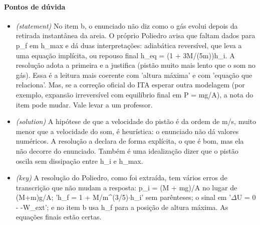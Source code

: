\documentclass{article}%
\begin{document}
\paragraph{Pontos de dúvida}%
\begin{itemize}%
\item%
\textit{(statement)} No item b, o enunciado não diz como o gás evolui depois da retirada instantânea da areia. O próprio Poliedro avisa que faltam dados para p\_f em h\_max e dá duas interpretações: adiabática reversível, que leva a uma equação implícita, ou repouso final h\_eq = (1 + 3M/(5m))h\_i. A resolução adota a primeira e a justifica (pistão muito mais lento que o som no gás). Essa é a leitura mais coerente com 'altura máxima' e com 'equação que relaciona'. Mas, se a correção oficial do ITA esperar outra modelagem (por exemplo, expansão irreversível com equilíbrio final em P = mg/A), a nota do item pode mudar. Vale levar a um professor.%
\item%
\textit{(solution)} A hipótese de que a velocidade do pistão é da ordem de m/s, muito menor que a velocidade do som, é heurística: o enunciado não dá valores numéricos. A resolução a declara de forma explícita, o que é bom, mas ela não decorre do enunciado. Também é uma idealização dizer que o pistão oscila sem dissipação entre h\_i e h\_max.%
\item%
\textit{(key)} A resolução do Poliedro, como foi extraída, tem vários erros de transcrição que não mudam a resposta: p\_i = (M + mg)/A no lugar de (M+m)g/A; 'h\_f = 1 + M/m\^{}(3/5)$\cdot$h\_i' sem parênteses; o sinal em '$\Delta$U = 0 - -W\_ext'; e no item b usa h\_f para a posição de altura máxima. As equações finais estão certas.%
\end{itemize}%
\end{document}
